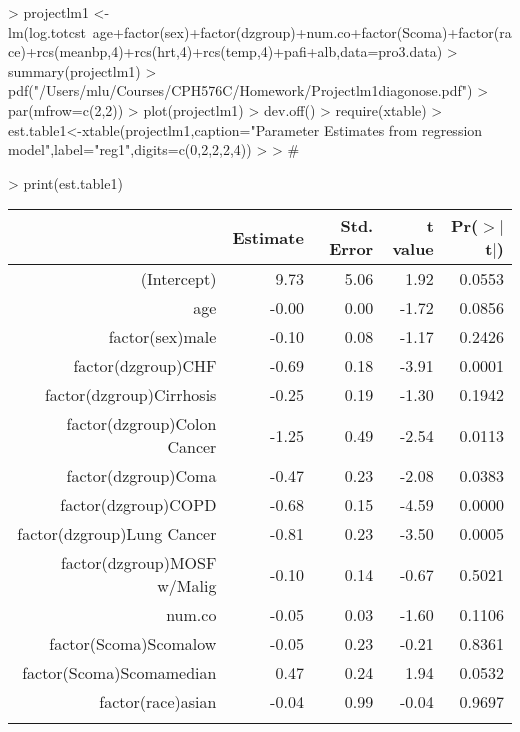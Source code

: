 \documentclass{article}
\begin{document}
\begin{Schunk}
\begin{Sinput}
> projectlm1 <- lm(log.totcst~age+factor(sex)+factor(dzgroup)+num.co+factor(Scoma)+factor(race)+rcs(meanbp,4)+rcs(hrt,4)+rcs(temp,4)+pafi+alb,data=pro3.data)
> summary(projectlm1)
> pdf("/Users/mlu/Courses/CPH576C/Homework/Projectlm1diagonose.pdf")
> par(mfrow=c(2,2))
> plot(projectlm1)
> dev.off()
> require(xtable)
> est.table1<-xtable(projectlm1,caption="Parameter Estimates from regression model",label="reg1",digits=c(0,2,2,2,4))
> 
> #
\end{Sinput}
\end{Schunk}



\begin{Schunk}
\begin{Sinput}
> print(est.table1)
\end{Sinput}
% latex table generated in R 3.1.1 by xtable 1.7-3 package
% Fri Sep 19 22:45:02 2014
\begin{table}[ht]
\centering
\begin{tabular}{rrrrr}
  \hline
 & Estimate & Std. Error & t value & Pr($>$$|$t$|$) \\ 
  \hline
(Intercept) & 9.73 & 5.06 & 1.92 & 0.0553 \\ 
  age & -0.00 & 0.00 & -1.72 & 0.0856 \\ 
  factor(sex)male & -0.10 & 0.08 & -1.17 & 0.2426 \\ 
  factor(dzgroup)CHF & -0.69 & 0.18 & -3.91 & 0.0001 \\ 
  factor(dzgroup)Cirrhosis & -0.25 & 0.19 & -1.30 & 0.1942 \\ 
  factor(dzgroup)Colon Cancer & -1.25 & 0.49 & -2.54 & 0.0113 \\ 
  factor(dzgroup)Coma & -0.47 & 0.23 & -2.08 & 0.0383 \\ 
  factor(dzgroup)COPD & -0.68 & 0.15 & -4.59 & 0.0000 \\ 
  factor(dzgroup)Lung Cancer & -0.81 & 0.23 & -3.50 & 0.0005 \\ 
  factor(dzgroup)MOSF w/Malig & -0.10 & 0.14 & -0.67 & 0.5021 \\ 
  num.co & -0.05 & 0.03 & -1.60 & 0.1106 \\ 
  factor(Scoma)Scomalow & -0.05 & 0.23 & -0.21 & 0.8361 \\ 
  factor(Scoma)Scomamedian & 0.47 & 0.24 & 1.94 & 0.0532 \\ 
  factor(race)asian & -0.04 & 0.99 & -0.04 & 0.9697 \\ 
$$
\end{tabular}
\end{table}
\end{Schunk}
\end{document}
